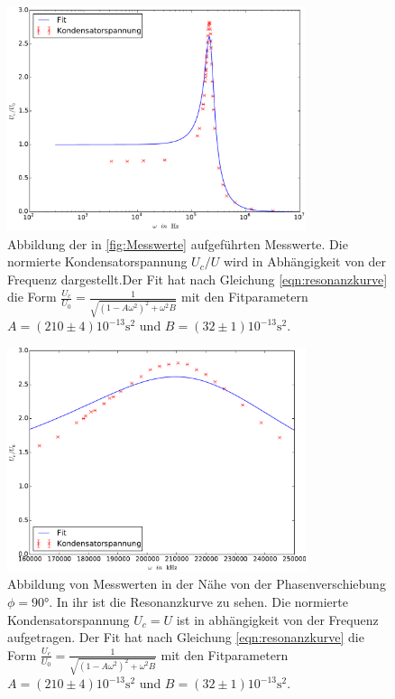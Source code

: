 \begin{figure}
  \centering
  \includegraphics[width=0.78\textwidth]{Kondensatorspannung.pdf}
  \caption{Abbildung der in \ref{fig:Messwerte} aufgeführten Messwerte.
  Die normierte Kondensatorspannung $U_c/U$ wird in Abhängigkeit von der
  Frequenz dargestellt.Der Fit hat nach Gleichung \eqref{eqn:resonanzkurve} die Form
  $\frac{U_c}{U_0}=\frac{1}{\sqrt{(1-A\omega^2)^2+\omega^2 B}}$
  mit den Fitparametern $A=(210\pm4)10^{-13}\si{\second}^2$ und $B=(32\pm1)10^{-13}\si{\second}^2$.}
  \label{fig:Kondensatorspannung}
\end{figure}
\begin{figure}
  \centering
  \includegraphics[width=0.78\textwidth]{Resonanzkurve.pdf}
  \caption{Abbildung von Messwerten in der Nähe von der Phasenverschiebung $\phi=90°$.
  In ihr ist die Resonanzkurve zu sehen. Die normierte Kondensatorspannung $U_c=U$
  ist in abhängigkeit von der Frequenz aufgetragen. Der Fit hat nach Gleichung \eqref{eqn:resonanzkurve} die Form
  $\frac{U_c}{U_0}=\frac{1}{\sqrt{(1-A\omega^2)^2+\omega^2 B}}$
  mit den Fitparametern $A=(210\pm4)10^{-13}\si{\second}^2$ und $B=(32\pm1)10^{-13}\si{\second}^2$.}
  \label{fig:Resonanzkurve}
\end{figure}
